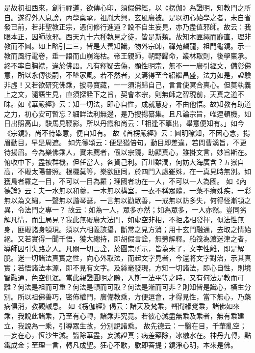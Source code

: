 是故初祖西來，創行禪道，欲傳心印，須假佛經，以《楞伽》為證明，知教門之所自。遂得外人息謗，內學稟承，祖胤大興，玄風廣被。是以初心始學之者，未自省發已前，若非聖教正宗，憑何修行進道？設不自生妄見，亦乃盡值邪師。故云：我眼本正，因師故邪。西天九十六種執見之徒，皆是斯類。故知木匪繩而靡直，理非教而不圓。如上略引二三，皆是大善知識，物外宗師，禪苑麟龍，祖門龜鏡。示一教而風行電卷，垂一語而山崩海枯。帝王親師，朝野歸命，叢林取則，後學稟承。終不率自胸襟，違於佛語。凡有釋疑去偽，顯性明宗，無不一一廣引經文，備彰佛意，所以永傳後嗣，不墜家風。若不然者，又焉得至今紹繼昌盛，法力如是，證驗非虛！又若欲研究佛乘，披尋寶藏，一一須消歸自己，言言使冥合真心。但莫執義上之文，隨語生見，直須探詮下之旨，契會本宗，則無師之智現前，天真之道不昧。如《華嚴經》云：知一切法，即心自性，成就慧身，不由他悟。故知教有助道之力，初心安可暫忘？細詳法利無邊，是乃搜揚纂集。且凡論宗旨，唯逗頓機，如日出照高山，駃馬見鞭影。所以丹霞和尚云：「相逢不擎出，舉意便知有。」如今《宗鏡》，尚不待舉意，便自知有。
故《首楞嚴經》云：{\kaishu 圓明瞭知，不因心念，揚眉動目，早是周遮}。
如先德頌云：{\kaishu 便是猶倍句，動目即差違，若問曹溪旨，不更待揚眉}。今為樂佛乘人，實未薦者，假以宗鏡，助顯真心，雖掛文言，妙旨斯在。俯收中下，盡被群機，但任當人，各資己利。百川雖潤，何妨大海廣含？五嶽自高，不礙太陽普照。根機莫等，樂欲匪同，於四門入處雖殊，在一真見時無別。如獲鳥者羅之一目，不可以一目為羅；理國者功在一人，不可以一人為國。
如《內德論》云：{\kaishu 夫一水無以和羹，一木無以構室，一衣不稱眾體，一藥不療殊疾，一彩無以為文繡，一聲無以諧琴瑟，一言無以勸眾善，一戒無以防多失，何得怪漸頓之異，令法門之專一}？
故云：{\kaishu 如為一人，眾多亦然；如為眾多，一人亦然。豈同劣解凡情，而生局見}？我此無礙廣大法門，如虛空非相，不拒諸相發揮，似法性無身，匪礙諸身頓現。須以六相義該攝，斷常之見方消；用十玄門融通，去取之情始絕。又若實得一聞千悟，獲大總持，即胡假言詮，無勞解釋。船筏為渡迷津之者，導師因引失路之人。凡關一切言詮，於圓宗所示，皆為未了，文字性離，即是解脫。迷一切諸法真實之性，向心外取法，而起文字見者，今還將文字對治，示其真實；若悟諸法本源，即不見有文字。及絲毫發現，方知一切諸法，即心自性，則境智融通，色空俱泯。當此親證圓明之際，入斯一法平等之時，又有何法是教而可離？何法是祖而可重？何法是頓而可取？何法是漸而可非？則知皆是識心，橫生分別。所以祖佛善巧，密佈權門，廣備教乘，方便逗會，才得見性，當下無心，乃藥病俱消，教觀鹹息。
如《楞伽經》偈云：{\kaishu 諸天及梵乘，聲聞緣覺乘，諸佛如來乘，我說此諸乘，乃至有心轉，諸乘非究竟。若彼心滅盡無乘及乘者，無有乘建立，我說為一乘，引導眾生故，分別說諸乘}。
故先德云：{\kaishu 一翳在目，千華亂空；一妄在心，恆沙生滅。翳除華盡，妄滅證真；病差藥除，冰融水在。神丹九轉，點鐵成金；至理一言，轉凡成聖。狂心不歇，歇即菩提；鏡淨心明，本來是佛}。


